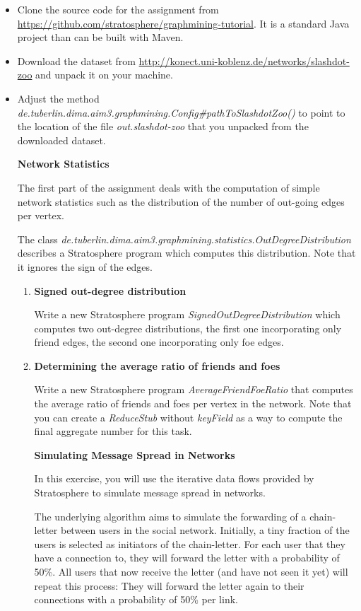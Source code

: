 \documentclass[11pt,a4paper]{article}
\begin{document}
\begin{itemize}
	\item Clone the source code for the assignment from \url{https://github.com/stratosphere/graphmining-tutorial}. It is a standard Java project than can be built with Maven.

	\item Download the dataset from \url{http://konect.uni-koblenz.de/networks/slashdot-zoo} and unpack it on your machine.

	\item Adjust the method \textit{de.tuberlin.dima.aim3.graphmining.Config\#pathToSlashdotZoo()} to point to the location of the file \textit{out.slashdot-zoo} that you unpacked from the downloaded dataset.

\bigskip
\bigskip
\bigskip
\centerline{\textbf{Network Statistics}}
\bigskip

The first part of the assignment deals with the computation of simple network statistics such as the distribution of the number of out-going edges per vertex. 

The class \textit{de.tuberlin.dima.aim3.graphmining.statistics.OutDegreeDistribution} describes a Stratosphere program which computes this distribution. Note that it ignores the sign of the edges.

\begin{enumerate}

\item \textbf{Signed out-degree distribution}

Write a new Stratosphere program \textit{SignedOutDegreeDistribution} which computes two out-degree distributions, the first one incorporating only friend edges, the second one incorporating only foe edges.

\item \textbf{Determining the average ratio of friends and foes}

Write a new Stratosphere program \textit{AverageFriendFoeRatio} that computes the average ratio of friends and foes per vertex in the network. Note that you can create a \textit{ReduceStub} without \textit{keyField} as a way to compute the final aggregate number for this task.
 
\newpage
\centerline{\textbf{Simulating Message Spread in Networks}}

In this exercise, you will use the iterative data flows provided by Stratosphere to simulate message spread in networks. 

The underlying algorithm aims to simulate the forwarding of a chain-letter between users in the social network. Initially, a tiny fraction of the users is selected as initiators of the chain-letter. For each user that they have a connection to, they will forward the letter with a probability of 50\%. All users that now receive the letter (and have not seen it yet) will repeat this process: They will forward the letter again to their connections with a probability of 50\% per link.


\end{enumerate}
\end{itemize}
\end{document}

